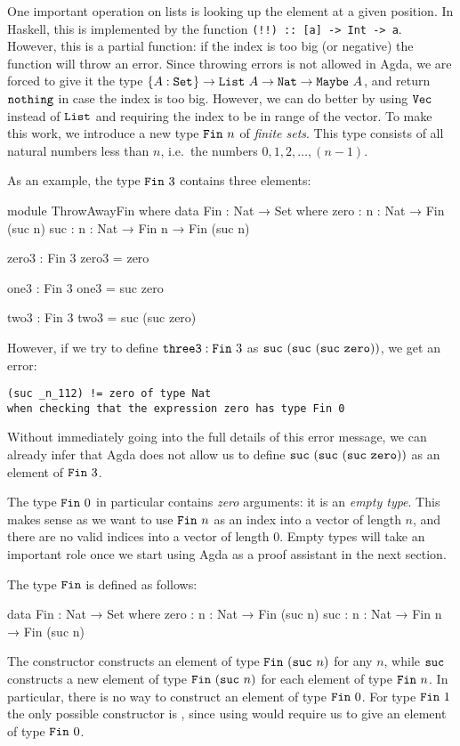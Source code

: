 \documentclass[a4paper,UKenglish]{tufte-handout}
\theoremstyle{definition}
\newcommand\prim[1]{{\AgdaPrimitive{#1}}}
\newcommand\ty[1]{{{\prim{Set}}_{#1}}}
\newcommand\fun[1]{{\AgdaFunction{#1}}}
\newcommand\data[1]{{\AgdaFunction{#1}}}
\newcommand\con[1]{{\AgdaInductiveConstructor{#1}}}
\newcommand\Nat{\data{Nat}}
\newcommand\zero{\con{zero}}
\newcommand\suc{\con{suc}}
\newcommand\List{\data{List}}
\renewcommand\Vec{\data{Vec}}
\newcommand\Fin{\data{Fin}}
\begin{document}
One important operation on lists is looking up the element at a given
position. In Haskell, this is implemented by the function
\texttt{(!!)~::~[a] -> Int -> a}. However, this is a partial function:
if the index is too big (or negative) the function will throw an
error. Since throwing errors is not allowed in Agda, we are forced to
give it the type $\{A : \ty{}\} \to \List\ A \to \Nat \to
\data{Maybe}\ A$, and return $\con{nothing}$ in case the index is too
big. However, we can do better by using $\Vec$ instead of $\List$ and
requiring the index to be in range of the vector. To make this work,
we introduce a new type $\Fin\ n$ of \emph{finite sets}. This type
consists of all natural numbers less than $n$, i.e.~the numbers
$0,1,2,\ldots,(n-1)$.

As an example, the type $\Fin\ 3$ contains three elements:
\begin{code}[hide]
module ThrowAwayFin where
  data Fin : Nat → Set where
    zero  : {n : Nat} → Fin (suc n)
    suc   : {n : Nat} → Fin n → Fin (suc n)
\end{code}
\begin{code}[number]
  zero3 : Fin 3
  zero3 = zero

  one3 : Fin 3
  one3   = suc zero

  two3 : Fin 3
  two3   = suc (suc zero)
\end{code}
However, if we try to define $\fun{three3} : \Fin\ 3$ as
$\suc\ (\suc\ (\suc\ \zero))$, we get an error:
\begin{verbatim}
(suc _n_112) != zero of type Nat
when checking that the expression zero has type Fin 0
\end{verbatim}
Without immediately going into the full details of this error message,
we can already infer that Agda does not allow us to
define $\suc\ (\suc\ (\suc\ \zero))$ as an element of $\Fin\ 3$.

The type $\Fin\ 0$ in particular 
contains \emph{zero} arguments: it is an \emph{empty type}.
This makes sense as we want to use $\Fin\ n$ as an index
into a vector of length $n$, and there are no valid indices
into a vector of length $0$. Empty types will take an important role once
we start using Agda as a proof assistant in the next section.

The type $\Fin$ is defined as follows:
\begin{code}[number]
data Fin : Nat → Set where
  zero  : {n : Nat} → Fin (suc n)
  suc   : {n : Nat} → Fin n → Fin (suc n)
\end{code}
The constructor \con{zero} constructs
an element of type $\data{Fin}~(\suc\ n)$ for any $n$,
while $\suc$ constructs a new element of type $\data{Fin}\ 
(\suc\ n)$ for each element of type $\data{Fin}\ n$.
In particular, there is no way
to construct an element of type $\data{Fin}\ 0$. 
For type $\Fin\ 1$ the only possible constructor is \zero, since
using \suc{} would require us to give an element of type $\Fin\ 0$.
\end{document}
